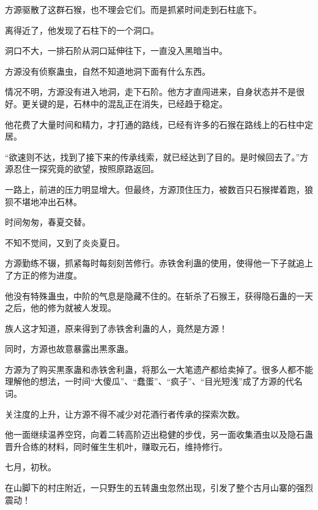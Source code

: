 \begin{this_body}
方源驱散了这群石猴，也不理会它们。而是抓紧时间走到石柱底下。

离得近了，他发现了石柱下的一个洞口。

洞口不大，一排石阶从洞口延伸往下，一直没入黑暗当中。

方源没有侦察蛊虫，自然不知道地洞下面有什么东西。

情况不明，方源没有进入地洞，走下石阶。他方才直闯进来，自身状态并不是很好。更关键的是，石林中的混乱正在消失，已经趋于稳定。

他花费了大量时间和精力，才打通的路线，已经有许多的石猴在路线上的石柱中定居。

“欲速则不达，找到了接下来的传承线索，就已经达到了目的。是时候回去了。”方源忍住一探究竟的欲望，按照原路返回。

一路上，前进的压力明显增大。但最终，方源顶住压力，被数百只石猴撵着跑，狼狈不堪地冲出石林。

时间匆匆，春夏交替。

不知不觉间，又到了炎炎夏日。

方源勤练不辍，抓紧每时每刻刻苦修行。赤铁舍利蛊的使用，使得他一下子就追上了方正的修为进度。

他没有特殊蛊虫，中阶的气息是隐藏不住的。在斩杀了石猴王，获得隐石蛊的一天之后，他的修为就被人发现。

族人这才知道，原来得到了赤铁舍利蛊的人，竟然是方源！

同时，方源也故意暴露出黒豕蛊。

方源为了购买黒豕蛊和赤铁舍利蛊，将那么一大笔遗产都给卖掉了。很多人都不能理解他的想法，一时间“大傻瓜”、“蠢蛋”、“疯子”、“目光短浅”成了方源的代名词。

关注度的上升，让方源不得不减少对花酒行者传承的探索次数。

他一面继续温养空窍，向着二转高阶迈出稳健的步伐，另一面收集酒虫以及隐石蛊晋升合练的材料，同时催生生机叶，赚取元石，维持修行。

七月，初秋。

在山脚下的村庄附近，一只野生的五转蛊虫忽然出现，引发了整个古月山寨的强烈震动！

\end{this_body}

